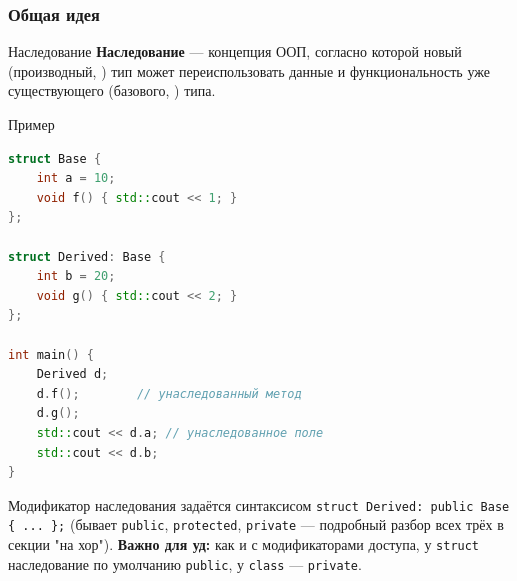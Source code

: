 \subsubsection{Общая идея}
\begin{definition}{Наследование}{}
\textbf{Наследование} --- концепция ООП, согласно которой новый (производный, ) тип может переиспользовать данные и функциональность уже существующего (базового, ) типа.
\end{definition}
\begin{implementation}{Пример}{}
\begin{lstlisting}[language=C++]
struct Base {
    int a = 10;
    void f() { std::cout << 1; }
};

struct Derived: Base {
    int b = 20;
    void g() { std::cout << 2; }
};

int main() {
    Derived d;
    d.f();        // унаследованный метод
    d.g();
    std::cout << d.a; // унаследованное поле
    std::cout << d.b;
}
\end{lstlisting}
\end{implementation}
Модификатор наследования задаётся синтаксисом \texttt{struct Derived: public Base \{ ... \};} (бывает \texttt{public}, \texttt{protected}, \texttt{private} --- подробный разбор всех трёх в секции "на хор"). \textbf{Важно для уд:} как и с модификаторами доступа, у \texttt{struct} наследование по умолчанию \texttt{public}, у \texttt{class} --- \texttt{private}.
